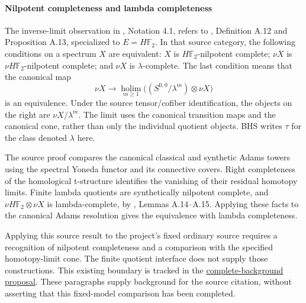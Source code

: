 \paragraph*{Nilpotent completeness and lambda completeness}
The inverse-limit observation in \cite{LWX126}, Notation 4.1, refers to
\cite{BHS}, Definition A.12 and Proposition A.13, specialized to
$E=H\mathbb F_2$. In that source category, the following conditions
on a spectrum $X$ are equivalent: $X$ is $H\mathbb F_2$-nilpotent
complete; $\nu X$ is $\nu H\mathbb F_2$-nilpotent complete; and
$\nu X$ is $\lambda$-complete. The last condition means that the
canonical map
\[
\nu X\longrightarrow\operatorname*{holim}_{m\geq1}
       \bigl((S^{0,0}/\lambda^m)\otimes\nu X\bigr)
\]
is an equivalence. Under the source tensor/cofiber identification, the
objects on the right are $\nu X/\lambda^m$. The limit uses the
canonical transition maps and the canonical cone, rather than only the
individual quotient objects. BHS writes $\tau$ for the class denoted
$\lambda$ here.

The source proof compares the canonical classical and synthetic Adams
towers using the spectral Yoneda functor and its connective covers.
Right completeness of the homological t-structure identifies the
vanishing of their residual homotopy limits. Finite lambda quotients
are synthetically nilpotent complete, and
$\nu H\mathbb F_2\otimes\nu X$ is lambda-complete, by
\cite{BHS}, Lemmas A.14--A.15. Applying these facts to the canonical
Adams resolution gives the equivalence with lambda completeness.

Applying this source result to the project's fixed ordinary source
requires a recognition of nilpotent completeness and a comparison with
the specified homotopy-limit cone. The finite quotient interface does
not supply those constructions. This existing boundary is tracked in
the \href{proposals/index.html#AdamsSynthetic-20261019-paper-complete-fixed-background}{complete-background proposal}.
These paragraphs supply background for the source citation, without
asserting that this fixed-model comparison has been completed.

